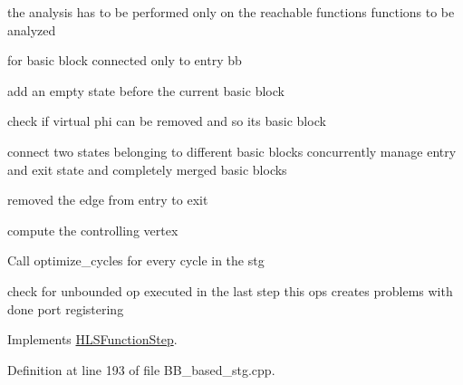 the analysis has to be performed only on the reachable functions functions to be analyzed

for basic block connected only to entry bb

add an empty state before the current basic block

check if virtual phi can be removed and so its basic block

connect two states belonging to different basic blocks concurrently manage entry and exit state and completely merged basic blocks

removed the edge from entry to exit

compute the controlling vertex





Call optimize\+\_\+cycles for every cycle in the stg





check for unbounded op executed in the last step this ops creates problems with done port registering 

Implements \hyperlink{classHLSFunctionStep_a8db4c00d080655984d98143206fc9fa8}{H\+L\+S\+Function\+Step}.



Definition at line 193 of file B\+B\+\_\+based\+\_\+stg.\+cpp.



